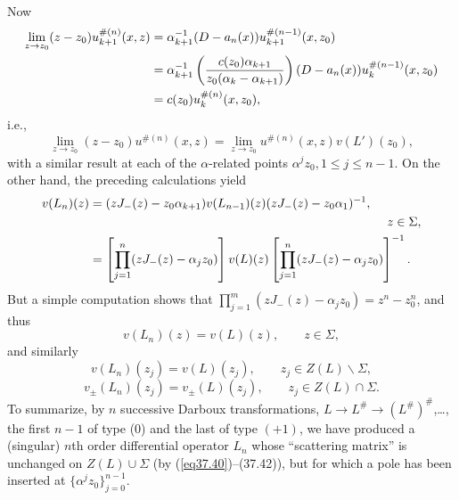 \documentclass{surv-l}
\theoremstyle{plain}
\theoremstyle{definition}
\numberwithin{equation}{chapter}
\begin{document}
Now
\begin{align}\label{eq37.37}
\lim_{z\rightarrow z_{0}}(z-z_{0})u_{k+1}^{\#(n)}(x, z)& =\alpha_{k+1}^{-1}(D-a_{n}(x))u_{k+1}^{\#(n-1)}(x, z_{0})\\
& =\alpha_{k+1}^{-1}\left(\frac{c(z_{0})\alpha_{k+1}}{z_{0}(\alpha_{k}-\alpha_{k+1})}\right)(D-a_{n}(x))u_{k}^{\#(n-1)}(x, z_{0})\notag \\
& =c(z_{0})u_{k}^{\#(n)}(x, z_{0}), \notag
\end{align}
i.e.,
\begin{equation}\label{eq37.38}
\lim_{z\rightarrow z_{0}}(z-z_{0})u^{\#(n)}(x, z)=\lim_{z\rightarrow z_{0}}u^{\#(n)}(x, z)v(L')(z_{0}),
\end{equation}
with a similar result at each of the $\alpha$-related points $\alpha^{j}z_{0},1\leq j\leq n-1$. On the other hand, the preceding calculations yield
\begin{align}\label{eq37.39}
v(L_{n})(z)&=(zJ_{-}(z)-z_{0}\alpha_{k+1})v(L_{n-1})(z)(zJ_{-}(z)-z_{0}\alpha_{1})^{-1},\\
& \qquad \qquad \qquad \qquad \qquad \qquad \qquad \qquad \qquad \qquad \qquad \qquad z\in\Sigma,\notag \\
& =\left[\prod_{j=1}^{n}(zJ_{-}(z)-\alpha_{j}z_{0})\right]v(L)(z)\left[\prod_{j=1}^{n}(zJ_{-}(z)-\alpha_{j}z_{0})\right]^{-1}. \notag
\end{align}
But a simple computation shows that $\prod_{j=1}^{m}(zJ_{-}(z)-\alpha_{j}z_{0})=z^{n}-z_{0}^{n}$, and thus
\begin{equation}\label{eq37.40}
v(L_{n})(z)=v(L)(z), \qquad  z\in\Sigma,
\end{equation}
and similarly
\begin{equation}\label{eq37.41}
v(L_{n})(z_{j})=v(L)(z_{j}), \qquad  z_{j}\in Z(L)\backslash \Sigma,
\end{equation}
\begin{equation}\label{eq37.42}
v_{\pm}(L_{n})(z_{j})=v_{\pm}(L)(z_{j}), \qquad  z_{j}\in Z(L)\cap\Sigma.
\end{equation}
To summarize, by $n$ successive Darboux transformations, $L\rightarrow L^{\#}\rightarrow(L^{\#})^{\#}$,\ldots, the first $n-1$ of type (0) and the last of type $(+1)$, we have produced a (singular) $n$th order differential operator $L_{n}$ whose ``scattering matrix'' is unchanged on $ Z(L)\cup\Sigma$ (by (\ref{eq37.40})--(37.42)), but for which a pole has been inserted at $\{\alpha^{j}z_{0}\}_{j=0}^{n-1}$.
\end{document}
